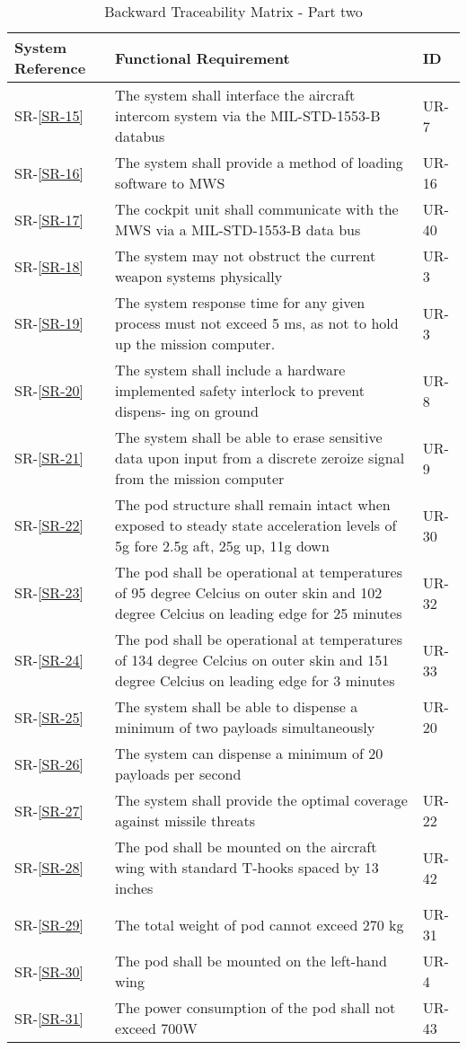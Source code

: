 \documentclass[Main]{subfiles}
\begin{document}
\begin{table}[htbp]
	\centering
	\begin{tabular}{p{1.8cm} p{11cm} l} \hline
	System Reference & Functional Requirement & ID\\\hline
	SR-\ref{SR-15} & The system shall interface the aircraft intercom system via the MIL-STD-1553-B
	databus & UR-7 \\
	SR-\ref{SR-16} & The system shall provide a method of loading software to MWS & UR-16 \\
	SR-\ref{SR-17} & The cockpit unit shall communicate with the MWS via a MIL-STD-1553-B data bus & UR-40 \\
	SR-\ref{SR-18} & The system may not obstruct the current weapon systems physically & UR-3 \\
	SR-\ref{SR-19} & The system response time for any given process must not exceed 5 ms, as not to hold up the mission computer. & UR-3 \\
	SR-\ref{SR-20} & The system shall include a hardware implemented safety interlock to prevent dispens-
	ing on ground & UR-8 \\
	SR-\ref{SR-21} & The system shall be able to erase sensitive data upon input from a discrete zeroize
	signal from the mission computer & UR-9 \\
	SR-\ref{SR-22} &  The pod structure shall remain intact when exposed to steady state acceleration levels
	of 5g fore 2.5g aft, 25g up, 11g down & UR-30 \\
	SR-\ref{SR-23} &  The pod shall be operational at temperatures of 95 degree Celcius on outer skin and
	102 degree Celcius on leading edge for 25 minutes & UR-32 \\
	SR-\ref{SR-24} &  The pod shall be operational at temperatures of 134 degree Celcius on outer skin and
	151 degree Celcius on leading edge for 3 minutes & UR-33 \\
	SR-\ref{SR-25} & The system shall be able to dispense a minimum of two payloads simultaneously  & UR-20 \\
	SR-\ref{SR-26} & The system can dispense a minimum of 20 payloads per second &  \\
	SR-\ref{SR-27} & The system shall provide the optimal coverage against	missile threats & UR-22 \\
	SR-\ref{SR-28} & The pod shall be mounted on the aircraft wing with standard T-hooks spaced by 13
	inches & UR-42 \\
	SR-\ref{SR-29} & The total weight of pod cannot exceed 270 kg  & UR-31 \\
	SR-\ref{SR-30} & The pod shall be mounted on the left-hand wing & UR-4 \\
	SR-\ref{SR-31} & The power consumption of the pod shall not exceed 700W & UR-43 \\\hline
	\end{tabular}

\caption{Backward Traceability Matrix - Part two}
\label{Tab:BackwardPartTwo}
\end{table}
\end{document}

